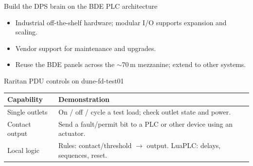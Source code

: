 \documentclass[aspectratio=169,11pt]{beamer}
\begin{document}
\begin{frame}{Build the DPS brain on the BDE PLC architecture}
\begin{itemize}
\item Industrial off-the-shelf hardware; modular I/O supports expansion and scaling.
\item Vendor support for maintenance and upgrades.
\item Reuse the BDE panels across the $\sim$70\,m mezzanine; extend to other systems.
\end{itemize}\par\medskip
\centering
{}\par\smallskip
\raggedright{}
\end{frame}

\begin{frame}{Raritan PDU controls on dune-fd-test01}
\centering
{}\par\smallskip
\raggedright
\renewcommand{\arraystretch}{1.12}
\begin{tabularx}{\textwidth}{@{}>{\RaggedRight\arraybackslash}p{2.8cm}>{\RaggedRight\arraybackslash}X@{}}
\toprule
\textbf{Capability} & \textbf{Demonstration}\\\midrule
Single outlets & On / off / cycle a test load; check outlet state and power.\\
Contact output & Send a fault/permit bit to a PLC or other device using an actuator.\\
Local logic & Rules: contact/threshold $\rightarrow$ output. LuaPLC: delays, sequences, reset.\\
\bottomrule
\end{tabularx}\par\smallskip
\end{frame}
\end{document}
